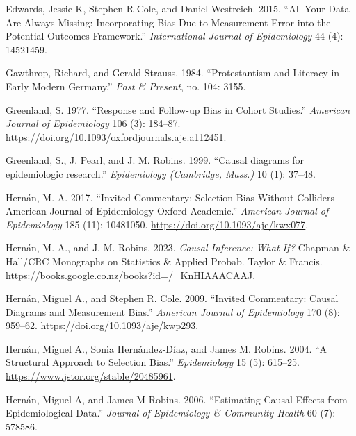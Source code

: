 \documentclass[
  singlecolumn]{report}
\newlength{\cslhangindent}
\newlength{\cslentryspacingunit} %
\newenvironment{CSLReferences}[2] %
 {%
  \setlength{\parindent}{0pt}
  \ifodd #1
  \let\oldpar\par
  \def\par{\hangindent=\cslhangindent\oldpar}
  \fi
  \setlength{\parskip}{#2\cslentryspacingunit}
 }%
 {}
\begin{document}
\begin{CSLReferences}{1}{0}
\leavevmode{}%
Edwards, Jessie K, Stephen R Cole, and Daniel Westreich. 2015. {``All
Your Data Are Always Missing: Incorporating Bias Due to Measurement
Error into the Potential Outcomes Framework.''} \emph{International
Journal of Epidemiology} 44 (4): 14521459.

\leavevmode{}%
Gawthrop, Richard, and Gerald Strauss. 1984. {``Protestantism and
Literacy in Early Modern Germany.''} \emph{Past \& Present}, no. 104:
3155.

\leavevmode{}%
Greenland, S. 1977. {``Response and Follow-up Bias in Cohort Studies.''}
\emph{American Journal of Epidemiology} 106 (3): 184--87.
\url{https://doi.org/10.1093/oxfordjournals.aje.a112451}.

\leavevmode{}%
Greenland, S., J. Pearl, and J. M. Robins. 1999. {``Causal diagrams for
epidemiologic research.''} \emph{Epidemiology (Cambridge, Mass.)} 10
(1): 37--48.

\leavevmode{}%
Hernán, M. A. 2017. {``Invited Commentary: Selection Bias Without
Colliders \textbar{} American Journal of Epidemiology \textbar{} Oxford
Academic.''} \emph{American Journal of Epidemiology} 185 (11): 10481050.
\url{https://doi.org/10.1093/aje/kwx077}.

\leavevmode{}%
Hernán, M. A., and J. M. Robins. 2023. \emph{Causal Inference: What If?}
Chapman \& Hall/CRC Monographs on Statistics \& Applied Probab. Taylor
\& Francis. \url{https://books.google.co.nz/books?id=/_KnHIAAACAAJ}.

\leavevmode{}%
Hernán, Miguel A., and Stephen R. Cole. 2009. {``Invited Commentary:
Causal Diagrams and Measurement Bias.''} \emph{American Journal of
Epidemiology} 170 (8): 959--62.
\url{https://doi.org/10.1093/aje/kwp293}.

\leavevmode{}%
Hernán, Miguel A., Sonia Hernández-Díaz, and James M. Robins. 2004. {``A
Structural Approach to Selection Bias.''} \emph{Epidemiology} 15 (5):
615--25. \url{https://www.jstor.org/stable/20485961}.

\leavevmode{}%
Hernán, Miguel A, and James M Robins. 2006. {``Estimating Causal Effects
from Epidemiological Data.''} \emph{Journal of Epidemiology \& Community
Health} 60 (7): 578586.


\end{CSLReferences}
\end{document}
